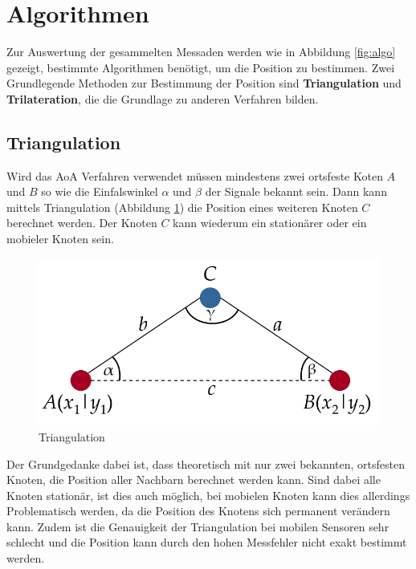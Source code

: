 \section{Algorithmen}
\label{sec:algorithmen}

Zur Auswertung der gesammelten Messaden werden wie in Abbildung
\ref{fig:algo} gezeigt, bestimmte Algorithmen benötigt, um die
Position zu bestimmen. Zwei Grundlegende Methoden zur Bestimmung der
Position sind \textbf{Triangulation} und \textbf{Trilateration}, die
die Grundlage zu anderen Verfahren bilden.

\subsection{Triangulation}

Wird das \ac{AoA} Verfahren verwendet müssen mindestens zwei ortsfeste
Koten $A$ und $B$ so wie die Einfalswinkel $\alpha$ und $\beta$ der
Signale bekannt sein. Dann kann mittels Triangulation (Abbildung
\ref{fig:triang}) die Position eines weiteren Knoten $C$ berechnet
werden. Der Knoten $C$ kann wiederum ein stationärer oder ein mobieler
Knoten sein.

\begin{figure}[h!]
  \centering
  \includegraphics[scale=0.3]{img/triang}

  \caption{Triangulation}
  \label{fig:triang}
\end{figure}

Der Grundgedanke dabei ist, dass theoretisch mit nur zwei bekannten,
ortsfesten Knoten, die Position aller Nachbarn berechnet werden kann.
Sind dabei alle Knoten stationär, ist dies auch möglich, bei mobielen
Knoten kann dies allerdings Problematisch werden, da die Position des
Knotens sich permanent verändern kann. Zudem ist die Genauigkeit der
Triangulation bei mobilen Sensoren sehr schlecht und die Position kann
durch den hohen Messfehler nicht exakt bestimmt werden.
\cite{roehrig2009} 


